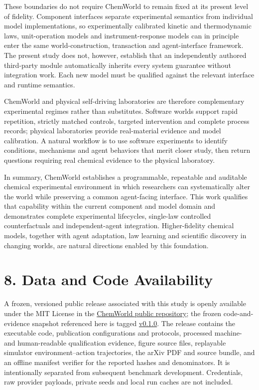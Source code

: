 \documentclass[10pt,twocolumn]{article}
\begin{document}
These boundaries do not require ChemWorld to remain fixed at its present
level of fidelity. Component interfaces separate experimental semantics
from individual model implementations, so experimentally calibrated
kinetic and thermodynamic laws, unit-operation models and
instrument-response models can in principle enter the same
world-construction, transaction and agent-interface framework. The
present study does not, however, establish that an independently
authored third-party module automatically inherits every system
guarantee without integration work. Each new model must be qualified
against the relevant interface and runtime semantics.

ChemWorld and physical self-driving laboratories are therefore
complementary experimental regimes rather than substitutes. Software
worlds support rapid repetition, strictly matched controls, targeted
intervention and complete process records; physical laboratories provide
real-material evidence and model calibration. A natural workflow is to
use software experiments to identify conditions, mechanisms and agent
behaviors that merit closer study, then return questions requiring real
chemical evidence to the physical laboratory.

In summary, ChemWorld establishes a programmable, repeatable and
auditable chemical experimental environment in which researchers can
systematically alter the world while preserving a common agent-facing
interface. This work qualifies that capability within the current
component and model domain and demonstrates complete experimental
lifecycles, single-law controlled counterfactuals and independent-agent
integration. Higher-fidelity chemical models, together with agent
adaptation, law learning and scientific discovery in changing worlds,
are natural directions enabled by this foundation.

\section{8. Data and Code
Availability}\label{data-and-code-availability}

A frozen, versioned public release associated with this study is openly
available under the MIT License in the
\href{https://github.com/sunyrain/ChemWorld-Public}{ChemWorld public
repository}; the frozen code-and-evidence snapshot referenced here is
tagged
\href{https://github.com/sunyrain/ChemWorld-Public/tree/v0.1.0}{v0.1.0}.
The release contains the executable code, publication configurations and
protocols, processed machine- and human-readable qualification evidence,
figure source files, replayable simulator environment--action
trajectories, the arXiv PDF and source bundle, and an offline manifest
verifier for the reported hashes and denominators. It is intentionally
separated from subsequent benchmark development. Credentials, raw
provider payloads, private seeds and local run caches are not included.
\end{document}
